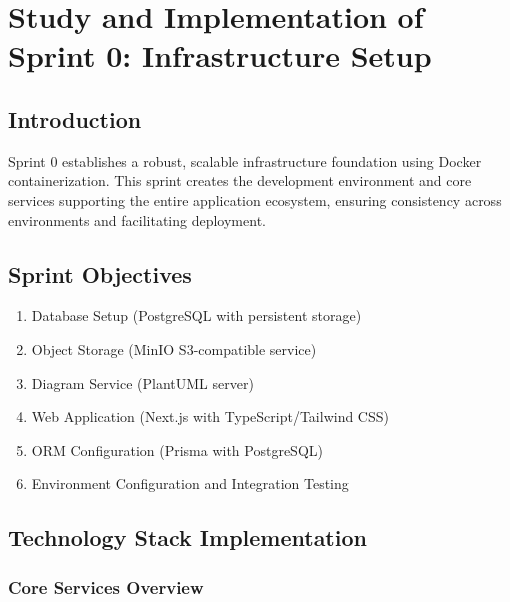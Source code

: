 \chapter[Sprint 0]{Study and Implementation of Sprint 0: Infrastructure Setup}

\section{Introduction}

Sprint 0 establishes a robust, scalable infrastructure foundation using  Docker containerization. This sprint creates the development environment and core services supporting the entire application ecosystem, ensuring consistency across environments and facilitating deployment.

\section{Sprint Objectives}

\begin{enumerate}
    \item Database Setup (PostgreSQL with persistent storage)
    \item Object Storage (MinIO S3-compatible service)
    \item Diagram Service (PlantUML server)
    \item Web Application (Next.js with TypeScript/Tailwind CSS)
    \item ORM Configuration (Prisma with PostgreSQL)

    \item Environment Configuration and Integration Testing
\end{enumerate}

\section{Technology Stack Implementation}

\subsection{Core Services Overview}

